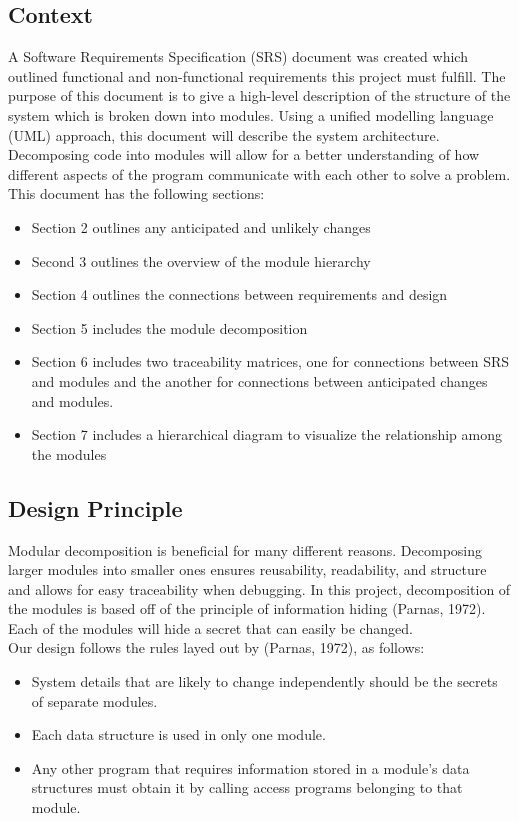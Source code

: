 \documentclass[12pt, titlepage]{article}
\begin{document}
\subsection{Context}
A Software Requirements Specification (SRS) document was created which outlined functional and non-functional requirements this project must fulfill. The purpose of this document is to give a high-level description of the structure of the system which is broken down into modules. Using a unified modelling language (UML) approach, this document will describe the system architecture. Decomposing code into modules will allow for a better understanding of how different aspects of the program communicate with each other to solve a problem. This document has the following sections:

\begin{itemize}
    \item Section 2 outlines any anticipated and unlikely changes
    \item Second 3 outlines the overview of the module hierarchy 
    \item Section 4 outlines the connections between requirements and design 
    \item Section 5 includes the module decomposition 
    \item Section 6 includes two traceability matrices, one for connections between SRS and modules and the another for connections between anticipated changes and modules.
    \item Section 7 includes a hierarchical diagram to visualize the relationship among the modules
\end{itemize}

\subsection{Design Principle}
Modular decomposition is beneficial for many different reasons. Decomposing larger modules into smaller ones ensures reusability, readability, and structure and allows for easy traceability when debugging. In this project, decomposition of the modules is based off of the principle of information hiding (Parnas, 1972). Each of the modules will hide a secret that can easily be changed. \\

Our design follows the rules layed out by (Parnas, 1972), as follows:
\begin{itemize}
\item System details that are likely to change independently should be the
  secrets of separate modules.
\item Each data structure is used in only one module.
\item Any other program that requires information stored in a module's data
  structures must obtain it by calling access programs belonging to that module.
\end{itemize}
\end{document}
